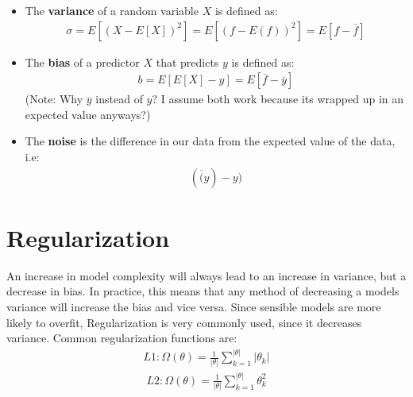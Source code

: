 \documentclass{report}
\newcommand{\tbf}{\textbf}
\begin{document}
\begin{itemize}
 \item The \tbf{variance} of a random variable $X$ is defined as:
 \begin{align}
  \sigma = E[(X - E[X])^2] = E[(f - E(f))^2] = E[f - \overline{f}]
 \end{align}
 \item The \tbf{bias} of a predictor $X$ that predicts $y$ is defined as:
 \begin{align}
  b = E[E[X] - y] = E[\overline{f} - \overline{y}]
 \end{align}
 (Note: Why $\overline{y}$ instead of $y$? I assume both work because its wrapped up in an expected value anyways?)
 \item The \tbf{noise} is the difference in our data from the expected value of the data, i.e:
 \begin{align}
  (\overline(y) - y)
 \end{align}
\end{itemize}
\section{Regularization}
An increase in model complexity will always lead to an increase in variance, but a decrease in bias. In practice, this means that any method of decreasing a models variance will increase the bias and vice versa. Since sensible models are more likely to overfit, Regularization is very commonly used, since it decreases variance. Common regularization functions are:
\begin{align}
 L1: \Omega(\theta) = \frac{1}{|\theta|} \sum_{k=1}^{|\theta|} |\theta_k|
\end{align}
\begin{align}
 L2: \Omega(\theta) = \frac{1}{|\theta|} \sum_{k=1}^{|\theta|} \theta_k^2
\end{align}
\end{document}

